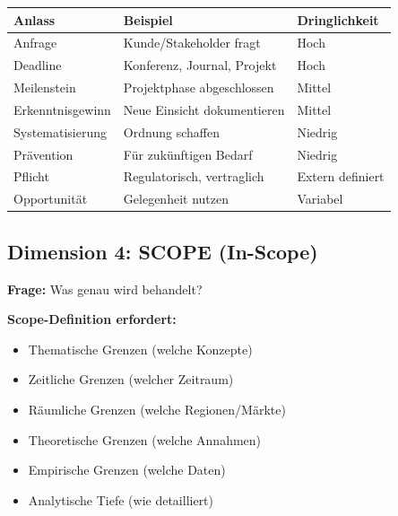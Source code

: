 \documentclass[12pt,a4paper]{article}
\begin{document}
\begin{table}[htbp]
\centering
\renewcommand{\arraystretch}{1.3}
\begin{tabular}{@{}lp{6cm}l@{}}
\toprule
\textbf{Anlass} & \textbf{Beispiel} & \textbf{Dringlichkeit} \\
\midrule
Anfrage & Kunde/Stakeholder fragt & Hoch \\
Deadline & Konferenz, Journal, Projekt & Hoch \\
Meilenstein & Projektphase abgeschlossen & Mittel \\
Erkenntnisgewinn & Neue Einsicht dokumentieren & Mittel \\
Systematisierung & Ordnung schaffen & Niedrig \\
Prävention & Für zukünftigen Bedarf & Niedrig \\
Pflicht & Regulatorisch, vertraglich & Extern definiert \\
Opportunität & Gelegenheit nutzen & Variabel \\
\bottomrule
\end{tabular}
\end{table}

\subsection{Dimension 4: SCOPE (In-Scope)}

\textbf{Frage:} Was genau wird behandelt?

\begin{tcolorbox}[colback=green!5!white, colframe=green!75!black]
\textbf{Scope-Definition erfordert:}
\begin{itemize}[nosep]
\item Thematische Grenzen (welche Konzepte)
\item Zeitliche Grenzen (welcher Zeitraum)
\item Räumliche Grenzen (welche Regionen/Märkte)
\item Theoretische Grenzen (welche Annahmen)
\item Empirische Grenzen (welche Daten)
\item Analytische Tiefe (wie detailliert)
\end{itemize}
\end{tcolorbox}

\end{document}
